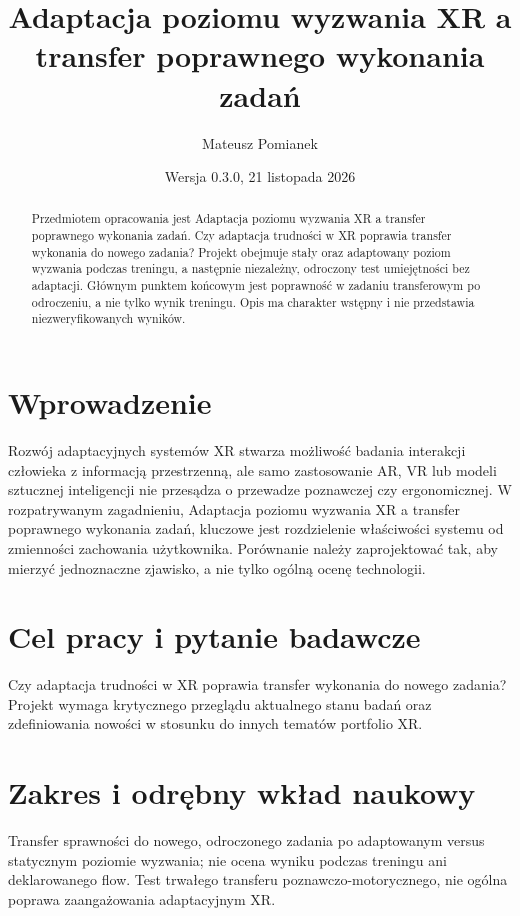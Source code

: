 \documentclass[11pt,a4paper]{article}
\title{Adaptacja poziomu wyzwania XR a transfer poprawnego wykonania zadań}
\author{Mateusz Pomianek}
\date{Wersja 0.3.0, 21 listopada 2026}
\begin{document}
\maketitle

\begin{abstract}

Przedmiotem opracowania jest Adaptacja poziomu wyzwania XR a transfer poprawnego wykonania zadań. Czy adaptacja trudności w XR poprawia transfer wykonania do nowego zadania? Projekt obejmuje stały oraz adaptowany poziom wyzwania podczas treningu, a następnie niezależny, odroczony test umiejętności bez adaptacji. Głównym punktem końcowym jest poprawność w zadaniu transferowym po odroczeniu, a nie tylko wynik treningu. Opis ma charakter wstępny i nie przedstawia niezweryfikowanych wyników.

\end{abstract}

\section{Wprowadzenie}

Rozwój adaptacyjnych systemów XR stwarza możliwość badania interakcji człowieka z informacją przestrzenną, ale samo zastosowanie AR, VR lub modeli sztucznej inteligencji nie przesądza o przewadze poznawczej czy ergonomicznej. W rozpatrywanym zagadnieniu, Adaptacja poziomu wyzwania XR a transfer poprawnego wykonania zadań, kluczowe jest rozdzielenie właściwości systemu od zmienności zachowania użytkownika. Porównanie należy zaprojektować tak, aby mierzyć jednoznaczne zjawisko, a nie tylko ogólną ocenę technologii.

\section{Cel pracy i pytanie badawcze}

Czy adaptacja trudności w XR poprawia transfer wykonania do nowego zadania? Projekt wymaga krytycznego przeglądu aktualnego stanu badań oraz zdefiniowania nowości w stosunku do innych tematów portfolio XR.

\section{Zakres i odrębny wkład naukowy}
Transfer sprawności do nowego, odroczonego zadania po adaptowanym versus statycznym poziomie wyzwania; nie ocena wyniku podczas treningu ani deklarowanego flow. Test trwałego transferu poznawczo-motorycznego, nie ogólna poprawa zaangażowania adaptacyjnym XR.
\end{document}

